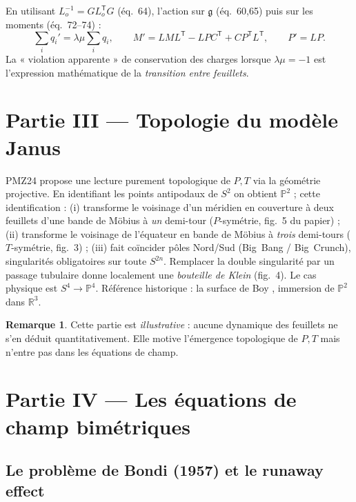 \documentclass[11pt,a4paper]{article}
\theoremstyle{definition}
\newtheorem{remarque}{Remarque}[section]
\theoremstyle{plain}
\newcommand{\eqpaper}[1]{\textsf{(éq.~#1)}}   %
\begin{document}
En utilisant $L_o^{-1}=GL_o^{\mathsf T}G$ \eqpaper{64}, l'action sur $\mathfrak g$ \eqpaper{60,65}
puis sur les moments \eqpaper{72--74} :
\begin{equation}
\sum_i q_i'=\lambda\mu\sum_i q_i,\qquad
M'=LML^{\mathsf T}-LPC^{\mathsf T}+CP^{\mathsf T}L^{\mathsf T},\qquad P'=LP.
\end{equation}
La « violation apparente » de conservation des charges lorsque $\lambda\mu=-1$ est
l'expression mathématique de la \emph{transition entre feuillets}.

\section{Partie III — Topologie du modèle Janus}
\label{part:topo}

PMZ24 propose une lecture purement topologique de $P,T$ via la géométrie projective.
En identifiant les points antipodaux de $S^2$ on obtient $\mathbb P^2$ ; cette identification :
(i) transforme le voisinage d'un méridien en couverture à deux feuillets d'une bande de
Möbius à \emph{un} demi-tour ($P$-symétrie, fig.~5 du papier) ; (ii) transforme le voisinage de
l'équateur en bande de Möbius à \emph{trois} demi-tours ($T$-symétrie, fig.~3) ;
(iii) fait coïncider pôles Nord/Sud (Big~Bang / Big~Crunch), singularités obligatoires sur
toute $S^{2n}$. Remplacer la double singularité par un passage tubulaire donne localement une
\emph{bouteille de Klein} (fig.~4). Le cas physique est $S^4\to\mathbb P^4$. Référence
historique : la surface de Boy \cite{Boy1903}, immersion de $\mathbb P^2$ dans $\mathbb R^3$.

\begin{remarque}
Cette partie est \emph{illustrative} : aucune dynamique des feuillets ne s'en déduit
quantitativement. Elle motive l'émergence topologique de $P,T$ mais n'entre pas dans les
équations de champ.
\end{remarque}

\section{Partie IV — Les équations de champ bimétriques}
\label{part:champ}

\subsection{Le problème de Bondi (1957) et le runaway effect}
\end{document}
